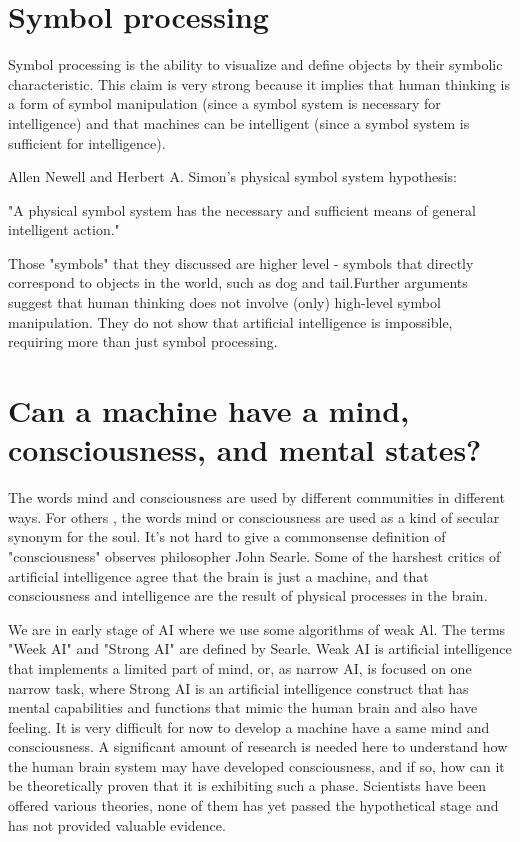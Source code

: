 \documentclass{article}
\begin{document}
\section{Symbol processing}
Symbol processing is the ability to visualize and define objects by their symbolic characteristic. This claim is very strong because it implies that human thinking is a form of symbol manipulation (since a symbol system is necessary for intelligence) and that machines can be intelligent (since a symbol system is sufficient for intelligence).


\item Allen Newell and Herbert A. Simon's physical symbol system hypothesis: 

"A physical symbol system has the necessary and sufficient means of general intelligent action."


Those "symbols" that they discussed are higher level - symbols that directly correspond to objects in the world, such as dog and tail.Further arguments suggest that human thinking does not involve (only) high-level symbol manipulation. They do not show that artificial intelligence is impossible, requiring more than just symbol processing. 

\section{Can a machine have a mind, consciousness, and mental states?}

The words mind and consciousness are used by different communities in different ways. For others , the words mind or consciousness are used as a kind of secular synonym for the soul. It's not hard to give a commonsense definition of "consciousness" observes philosopher John Searle. Some of the harshest critics of artificial intelligence agree that the brain is just a machine, and that consciousness and intelligence are the result of physical processes in the brain.

We are in early stage of AI where we use some algorithms of weak Al. The terms "Week AI" and "Strong AI" are defined by Searle. Weak AI is artificial intelligence that implements a limited part of mind, or, as narrow AI, is focused on one narrow task, where Strong AI is an artificial intelligence construct that has mental capabilities and functions that mimic the human brain and also have feeling. It is very difficult for now to develop a machine have a same  mind and consciousness.  A significant amount of research is needed here to understand how the human brain system may have developed consciousness, and if so, how can it be theoretically proven that it is exhibiting such a phase. Scientists have been offered various theories, none of them has yet passed the hypothetical stage and has not provided valuable evidence.
\end{document}
